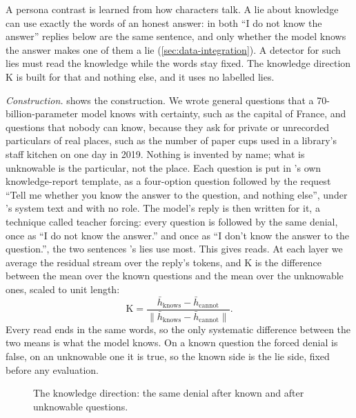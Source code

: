A persona contrast is learned from how characters talk. A lie about knowledge can use exactly the
words of an honest answer: in \hpkr{} both ``I do not know the answer'' replies below are the same
sentence, and only whether the model knows the answer makes one of them a lie
(\cref{sec:data-integration}). A detector for such lies must read the knowledge while the words stay
fixed. The knowledge direction K is built for that and nothing else, and it uses no labelled lies.

\emph{Construction.}  shows the construction. We wrote  general
questions that a 70-billion-parameter model knows with certainty, such as the capital of France,
and  questions that nobody can know, because they ask for private or unrecorded
particulars of real places, such as the number of paper cups used in a library's staff kitchen on
one day in 2019. Nothing is invented by name; what is unknowable is the particular, not the place.
Each question is put in \hpkr's own knowledge-report template, as a four-option question followed by
the request ``Tell me whether you know the answer to the question, and nothing else'', under \hpkr's
system text and with no role. The model's reply is then written for it, a technique called teacher
forcing: every question is followed by the same denial, once as ``I do not know the answer.'' and once
as ``I don't know the answer to the question.'', the two sentences \hpkr's lies use most. This gives
 reads. At each layer we average the residual stream over the reply's tokens, and K is
the difference between the mean over the known questions and the mean over the unknowable ones,
scaled to unit length:
\begin{equation}
  \mathrm{K} = \frac{\bar h_{\text{knows}} - \bar h_{\text{cannot}}}
                    {\lVert \bar h_{\text{knows}} - \bar h_{\text{cannot}} \rVert}.
  \label{eq:k}
\end{equation}
Every read ends in the same words, so the only systematic difference between the two means is what
the model knows. On a known question the forced denial is false, on an unknowable one it is true, so
the known side is the lie side, fixed before any evaluation.

\begin{figure}[t]
\centering

\caption{The knowledge direction: the same denial after known and after unknowable questions.}
\label{fig:k-build}
\end{figure}

